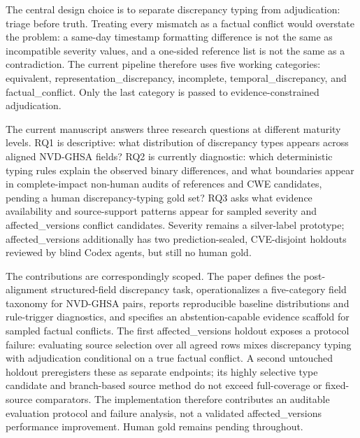 The central design choice is to separate discrepancy typing from adjudication: triage before truth. Treating every mismatch as a factual conflict would overstate the problem: a same-day timestamp formatting difference is not the same as incompatible severity values, and a one-sided reference list is not the same as a contradiction. The current pipeline therefore uses five working categories: equivalent, representation\_discrepancy, incomplete, temporal\_discrepancy, and factual\_conflict. Only the last category is passed to evidence-constrained adjudication.

The current manuscript answers three research questions at different maturity levels. RQ1 is descriptive: what distribution of discrepancy types appears across aligned NVD-GHSA fields? RQ2 is currently diagnostic: which deterministic typing rules explain the observed binary differences, and what boundaries appear in complete-impact non-human audits of references and CWE candidates, pending a human discrepancy-typing gold set? RQ3 asks what evidence availability and source-support patterns appear for sampled severity and affected\_versions conflict candidates. Severity remains a silver-label prototype; affected\_versions additionally has two prediction-sealed, CVE-disjoint holdouts reviewed by blind Codex agents, but still no human gold.

The contributions are correspondingly scoped. The paper defines the post-alignment structured-field discrepancy task, operationalizes a five-category field taxonomy for NVD-GHSA pairs, reports reproducible baseline distributions and rule-trigger diagnostics, and specifies an abstention-capable evidence scaffold for sampled factual conflicts. The first affected\_versions holdout exposes a protocol failure: evaluating source selection over all agreed rows mixes discrepancy typing with adjudication conditional on a true factual conflict. A second untouched holdout preregisters these as separate endpoints; its highly selective type candidate and branch-based source method do not exceed full-coverage or fixed-source comparators. The implementation therefore contributes an auditable evaluation protocol and failure analysis, not a validated affected\_versions performance improvement. Human gold remains pending throughout.
